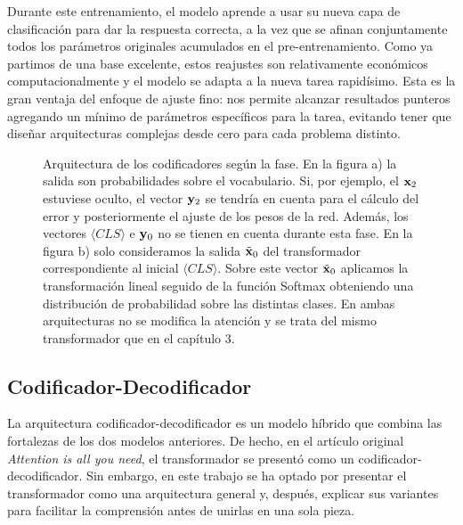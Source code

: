 Durante este entrenamiento, el modelo aprende a usar su nueva capa de clasificación para dar la respuesta correcta, a la vez que se afinan conjuntamente todos los parámetros originales acumulados en el pre-entrenamiento. Como ya partimos de una base excelente, estos reajustes son relativamente económicos computacionalmente y el modelo se adapta a la nueva tarea rapidísimo. Esta es la gran ventaja del enfoque de ajuste fino: nos permite alcanzar resultados punteros agregando un mínimo de parámetros específicos para la tarea, evitando tener que diseñar arquitecturas complejas desde cero para cada problema distinto.
\begin{figure}[htbp] 
     \centering       
    \hfill
    \caption{Arquitectura de los codificadores según la fase. En la figura a) la salida son probabilidades sobre el vocabulario. Si, por ejemplo, el \token{} $\mathbf{x}_2$ estuviese oculto, el vector $\mathbf{y}_2$ se tendría en cuenta para el cálculo del error y posteriormente el ajuste de los pesos de la red. Además, los vectores  $\langle CLS \rangle$ e $\mathbf{y}_0$ no se tienen en cuenta durante esta fase. En la figura b) solo consideramos la salida $\Tilde{\mathbf{x}}_0$ del transformador correspondiente al \token{} inicial $\langle CLS \rangle$. Sobre este vector $\Tilde{\mathbf{x}}_0$ aplicamos la transformación lineal seguido de la función Softmax obteniendo una distribución de probabilidad sobre las distintas clases. En ambas arquitecturas no se modifica la atención y se trata del mismo transformador que en el capítulo 3.}
    \label{fig:Codificadores} 
\end{figure}
\subsection{Codificador-Decodificador}
\label{subsec:codificador_decoficador}

La arquitectura codificador-decodificador es un modelo híbrido que combina las fortalezas de los dos modelos anteriores. De hecho, en el artículo original \textit{Attention is all you need}, el transformador se presentó como un codificador-decodificador. Sin embargo, en este trabajo se ha optado por presentar el transformador como una arquitectura general y, después, explicar sus variantes para facilitar la comprensión antes de unirlas en una sola pieza.

